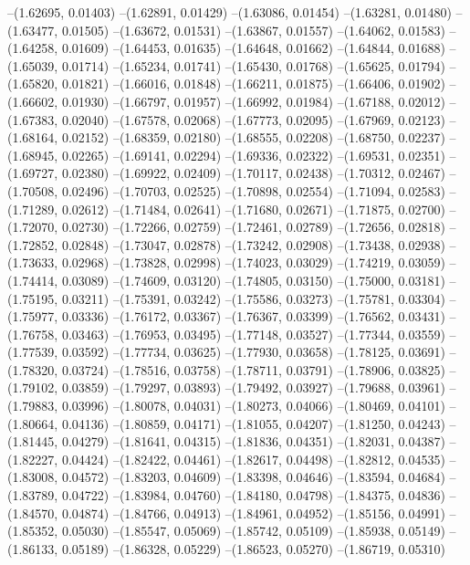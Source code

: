 --(1.62695, 0.01403)
--(1.62891, 0.01429)
--(1.63086, 0.01454)
--(1.63281, 0.01480)
--(1.63477, 0.01505)
--(1.63672, 0.01531)
--(1.63867, 0.01557)
--(1.64062, 0.01583)
--(1.64258, 0.01609)
--(1.64453, 0.01635)
--(1.64648, 0.01662)
--(1.64844, 0.01688)
--(1.65039, 0.01714)
--(1.65234, 0.01741)
--(1.65430, 0.01768)
--(1.65625, 0.01794)
--(1.65820, 0.01821)
--(1.66016, 0.01848)
--(1.66211, 0.01875)
--(1.66406, 0.01902)
--(1.66602, 0.01930)
--(1.66797, 0.01957)
--(1.66992, 0.01984)
--(1.67188, 0.02012)
--(1.67383, 0.02040)
--(1.67578, 0.02068)
--(1.67773, 0.02095)
--(1.67969, 0.02123)
--(1.68164, 0.02152)
--(1.68359, 0.02180)
--(1.68555, 0.02208)
--(1.68750, 0.02237)
--(1.68945, 0.02265)
--(1.69141, 0.02294)
--(1.69336, 0.02322)
--(1.69531, 0.02351)
--(1.69727, 0.02380)
--(1.69922, 0.02409)
--(1.70117, 0.02438)
--(1.70312, 0.02467)
--(1.70508, 0.02496)
--(1.70703, 0.02525)
--(1.70898, 0.02554)
--(1.71094, 0.02583)
--(1.71289, 0.02612)
--(1.71484, 0.02641)
--(1.71680, 0.02671)
--(1.71875, 0.02700)
--(1.72070, 0.02730)
--(1.72266, 0.02759)
--(1.72461, 0.02789)
--(1.72656, 0.02818)
--(1.72852, 0.02848)
--(1.73047, 0.02878)
--(1.73242, 0.02908)
--(1.73438, 0.02938)
--(1.73633, 0.02968)
--(1.73828, 0.02998)
--(1.74023, 0.03029)
--(1.74219, 0.03059)
--(1.74414, 0.03089)
--(1.74609, 0.03120)
--(1.74805, 0.03150)
--(1.75000, 0.03181)
--(1.75195, 0.03211)
--(1.75391, 0.03242)
--(1.75586, 0.03273)
--(1.75781, 0.03304)
--(1.75977, 0.03336)
--(1.76172, 0.03367)
--(1.76367, 0.03399)
--(1.76562, 0.03431)
--(1.76758, 0.03463)
--(1.76953, 0.03495)
--(1.77148, 0.03527)
--(1.77344, 0.03559)
--(1.77539, 0.03592)
--(1.77734, 0.03625)
--(1.77930, 0.03658)
--(1.78125, 0.03691)
--(1.78320, 0.03724)
--(1.78516, 0.03758)
--(1.78711, 0.03791)
--(1.78906, 0.03825)
--(1.79102, 0.03859)
--(1.79297, 0.03893)
--(1.79492, 0.03927)
--(1.79688, 0.03961)
--(1.79883, 0.03996)
--(1.80078, 0.04031)
--(1.80273, 0.04066)
--(1.80469, 0.04101)
--(1.80664, 0.04136)
--(1.80859, 0.04171)
--(1.81055, 0.04207)
--(1.81250, 0.04243)
--(1.81445, 0.04279)
--(1.81641, 0.04315)
--(1.81836, 0.04351)
--(1.82031, 0.04387)
--(1.82227, 0.04424)
--(1.82422, 0.04461)
--(1.82617, 0.04498)
--(1.82812, 0.04535)
--(1.83008, 0.04572)
--(1.83203, 0.04609)
--(1.83398, 0.04646)
--(1.83594, 0.04684)
--(1.83789, 0.04722)
--(1.83984, 0.04760)
--(1.84180, 0.04798)
--(1.84375, 0.04836)
--(1.84570, 0.04874)
--(1.84766, 0.04913)
--(1.84961, 0.04952)
--(1.85156, 0.04991)
--(1.85352, 0.05030)
--(1.85547, 0.05069)
--(1.85742, 0.05109)
--(1.85938, 0.05149)
--(1.86133, 0.05189)
--(1.86328, 0.05229)
--(1.86523, 0.05270)
--(1.86719, 0.05310)
